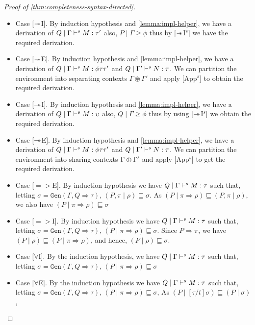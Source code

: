 \begin{proof}[Proof of \cref{thm:completeness-syntax-directed}]
\begin{itemize}
  \item{Case [$\mathrel{-\mkern-6mu*}$I].}
    By induction hypothesis and \cref{lemma:impl-helper}, we have a derivation of $Q \mid \Gamma \vdash^s M:\tau'$ also, $P \mid \Gamma \geq \phi$
    thus by [$\mathrel{-\mkern-6mu*}$I$^s$] we have the required derivation.
  \item{Case [$\mathrel{-\mkern-6mu*}$E].}
    By induction hypothesis and \cref{lemma:impl-helper}, we have a derivation of $Q \mid \Gamma \vdash^s M:\phi \tau \tau'$ and $Q \mid \Gamma' \vdash^s N: \tau$.
    We can partition the environment into separating contexts $\Gamma \circledast \Gamma'$ and apply [App$^s$] to obtain the required derivation.
  \item{Case [$\twoheadrightarrow$I].}
    By induction hypothesis and \cref{lemma:impl-helper}, we have a derivation of $Q \mid \Gamma \vdash^s M:\upsilon$ also, $Q \mid \Gamma \geq \phi$
    thus by using [$\twoheadrightarrow$I$^s$] we obtain the required derivation.
  \item{Case [$\twoheadrightarrow$E].}
    By induction hypothesis and \cref{lemma:impl-helper}, we have a derivation of $Q \mid \Gamma \vdash^s M:\phi \tau \tau'$ and $Q \mid \Gamma' \vdash^s N: \tau$.
    We can partition the environment into sharing contexts $\Gamma \varoplus \Gamma'$ and apply [App$^s$] to get the required derivation.
  \item{Case [$=>$E].}
    By induction hypothesis we have $Q \mid \Gamma \vdash^s M:\tau$ such that, letting $\sigma = \texttt{Gen}(\Gamma, Q \Rightarrow \tau)$,
    $(P, \pi \mid \rho) \sqsubseteq \sigma$. As $(P \mid \pi \Rightarrow \rho) \sqsubseteq (P, \pi \mid \rho)$, we also have
    $(P \mid \pi \Rightarrow \rho) \sqsubseteq \sigma$
  \item{Case [$=>$I].}
    By induction hypothesis we have $Q \mid \Gamma \vdash^s M: \tau$ such that, letting $\sigma = \texttt{Gen}(\Gamma, Q \Rightarrow \tau)$,
    $(P \mid \pi \Rightarrow \rho) \sqsubseteq \sigma$. Since $P \Rightarrow \pi$, we have $(P \mid \rho) \sqsubseteq (P \mid \pi \Rightarrow \rho)$, and hence,
    $(P \mid \rho) \sqsubseteq \sigma$.
  \item{Case [$\forall$I].}
    By the induction hypothesis, we have $Q \mid \Gamma \vdash^s M :\tau$ such that, letting $\sigma = \texttt{Gen}(\Gamma, Q \Rightarrow \tau)$,
    $(P \mid \pi \Rightarrow \rho) \sqsubseteq \sigma$
  \item{Case [$\forall$E].}
    By the induction hypothesis we have $Q \mid \Gamma \vdash^s M: \tau$ such that, letting $\sigma = \texttt{Gen}(\Gamma, Q \Rightarrow \tau)$,
    $(P \mid \pi \Rightarrow \rho) \sqsubseteq \sigma$, As $(P \mid [\tau/t]\sigma) \sqsubseteq (P \mid \sigma)$,

\end{itemize}
\end{proof}
